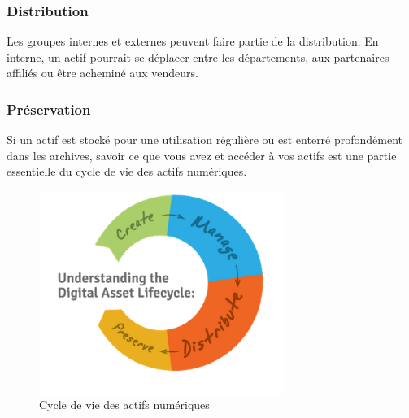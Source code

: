 \subsubsection{Distribution}{}  Les groupes internes et externes peuvent faire partie de la distribution. En interne, un actif pourrait se déplacer entre les départements, aux partenaires affiliés ou être acheminé aux vendeurs. 

\subsubsection{Préservation}{}  
Si un actif est stocké pour une utilisation régulière ou est enterré profondément dans les archives, savoir ce que vous avez et accéder à vos actifs est une partie essentielle du cycle de vie des actifs numériques.

    
\begin{figure}[!ht]
  \centering
   \includegraphics[width=8cm]{introduction/damm.PNG}
  \caption{Cycle de vie des actifs numériques}
  \label{fig:test1}      
\end{figure}


